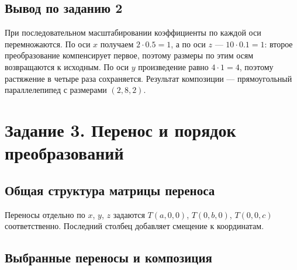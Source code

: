\documentclass[a4paper,14pt]{extarticle}
\begin{document}
\par\noindent\begin{minipage}{\linewidth}
\subsection*{Вывод по заданию 2}

При последовательном масштабировании коэффициенты по каждой оси перемножаются.
По оси $x$ получаем $2\cdot0.5=1$, а по оси $z$ — $10\cdot0.1=1$:
второе преобразование компенсирует первое, поэтому размеры по этим осям
возвращаются к исходным. По оси $y$ произведение равно $4\cdot1=4$,
поэтому растяжение в четыре раза сохраняется. Результат композиции —
прямоугольный параллелепипед с размерами $(2,8,2)$.

\end{minipage}\par
\section{Задание 3. Перенос и порядок преобразований}

\subsection*{Общая структура матрицы переноса}

\begin{center}\end{center}

Переносы отдельно по $x$, $y$, $z$ задаются $T(a,0,0)$, $T(0,b,0)$,
$T(0,0,c)$ соответственно. Последний столбец добавляет смещение к координатам.

\subsection*{Выбранные переносы и композиция}
\end{document}
